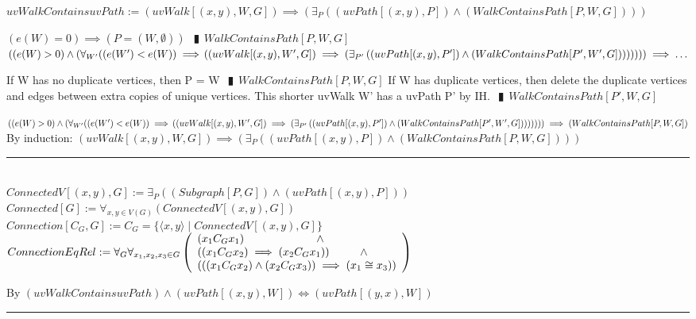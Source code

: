 \documentclass{book}
\newcommand{\abr}{:=}
\newcommand{\pipe}{$\phantom{(}\vrectangleblack\phantom{)}$}
\newcommand{\pr}[1]{\left(#1\right)}
\newcommand{\st}{\mathbin{|}}
\begin{document}
$uvWalkContainsuvPath \abr \pr{uvWalk[(x, y), W, G]} \implies \pr{\exists_{P}\pr{\pr{uvPath[(x, y), P]} \land (WalkContainsPath[P, W, G])}}$
\begin{enumerate}
  \lit $\pr{e(W) = 0} \implies \pr{P = (W, \emptyset)}$ \pipe $WalkContainsPath[P, W, G]$
  \lit $\pr{(e(W) > 0} \land \pr{\forall_{W'}((e(W') < e(W)} \implies \\
        \pr{\pr{uvWalk[(x, y), W', G]} \implies \pr{\exists_{P'}\pr{\pr{uvPath[(x, y), P']} \land (WalkContainsPath[P', W', G])}}}))) \implies \ldots$
  \begin{enumerate}
    \lit If W has no duplicate vertices, then P = W \pipe $WalkContainsPath[P, W, G]$
    \lit If W has duplicate vertices, then delete the duplicate vertices and edges between extra copies of unique vertices. This shorter uvWalk W' has a uvPath P' by IH. \pipe $WalkContainsPath[P', W, G]$
  \end{enumerate}
  \lit $\pr{(e(W) > 0} \land \pr{\forall_{W'}((e(W') < e(W)} \implies \\
  \pr{\pr{uvWalk[(x, y), W', G]} \implies \pr{\exists_{P'}\pr{\pr{uvPath[(x, y), P']} \land (WalkContainsPath[P', W', G])}}}))) \implies (WalkContainsPath[P, W, G])$
  \lit By induction: $\pr{uvWalk[(x, y), W, G]} \implies \pr{\exists_{P}\pr{\pr{uvPath[(x, y), P]} \land (WalkContainsPath[P, W, G])}}$
\end{enumerate} \vspace{.75mm} \hrule \vspace{.75mm} \ \\ 

$ConnectedV[(x, y), G] \abr \exists_{P}\pr{(Subgraph[P, G]) \land \pr{uvPath[(x, y), P]}}$ \\
$Connected[G] \abr \forall_{x, y \in V(G)}\pr{ConnectedV[(x, y), G]}$ \\
$Connection[C_G, G] \abr C_G = \{\langle x, y \rangle \st ConnectedV[(x, y), G]\}$ \\

$ConnectionEqRel \abr \forall_{G} \forall_{x_1, x_2, x_3 \in G}
\left(\begin{array}{ll}
  (x_1 C_G x_1) \hfill \land \hfill \\
  \pr{(x_1 C_G x_2) \implies (x_2 C_G x_1)} \hfill \land \hfill \\
  \pr{\pr{(x_1 C_G x_2) \land (x_2 C_G x_3)} \implies (x_1 \cong x_3)} \\
\end{array}\right)$
\begin{enumerate}
  \lit By $(uvWalkContainsuvPath) \land \pr{uvPath[(x, y), W]} \iff \pr{uvPath[(y, x), W]}$
\end{enumerate} \vspace{.75mm} \hrule \vspace{.75mm} \ \\ 
\end{document}
